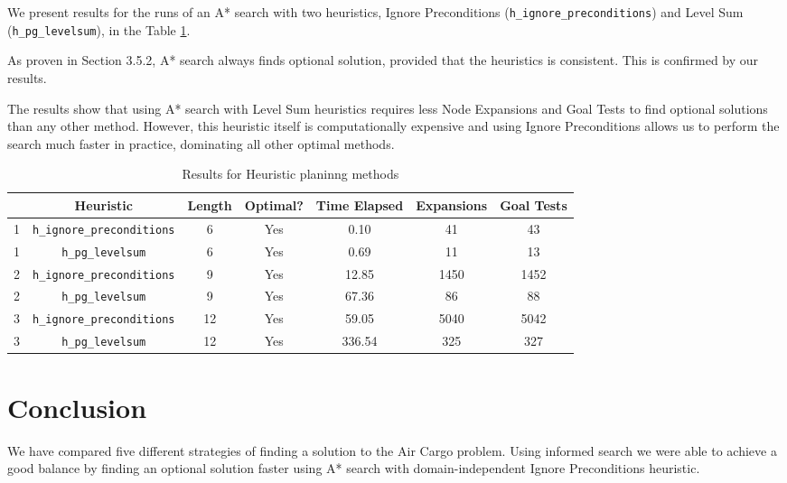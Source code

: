 \documentclass[oneside]{article}   	%
\newcommand{\hip}{\texttt{h\_ignore\_preconditions}}
\newcommand{\hpg}{\texttt{h\_pg\_levelsum}}
\begin{document}
We present results for the runs of an A* search with two heuristics, Ignore Preconditions (\hip) and Level Sum (\hpg), in the Table \ref{Heuristic}. 

As proven in Section 3.5.2, A* search always finds optional solution, provided that the heuristics is consistent. This is confirmed by our results.

The results show that using A* search with Level Sum heuristics requires less Node Expansions and Goal Tests to find optional solutions than any other method. However, this heuristic itself is computationally expensive and using Ignore Preconditions allows us to perform the search much faster in practice, dominating all other optimal methods.

\begin{table}[ht]
\caption{Results for Heuristic planinng methods}
\begin{center}
\begin{tabular}{c|c|ccccc}
   & Heuristic & Length & Optimal? & Time Elapsed & Expansions & Goal Tests\\
   \hline
1 & \hip & 6 & Yes & 0.10 & 41 & 43 \\
1 & \hpg & 6 & Yes & 0.69 & 11 & 13 \\
   \hline
2 & \hip & 9 & Yes & 12.85 & 1450 & 1452 \\
2 & \hpg & 9 & Yes & 67.36 &  86 & 88  \\
   \hline
3 & \hip & 12 & Yes & 59.05 & 5040 & 5042 \\
3 & \hpg & 12 & Yes & 336.54 & 325 & 327 
\end{tabular}
\end{center}
\label{Heuristic}
\end{table}%

\section{Conclusion}

We have compared five different strategies of finding a solution to the Air Cargo problem. Using informed search we were able to achieve a good balance by finding an optional solution faster using A* search with domain-independent Ignore Preconditions heuristic. 
\end{document}
